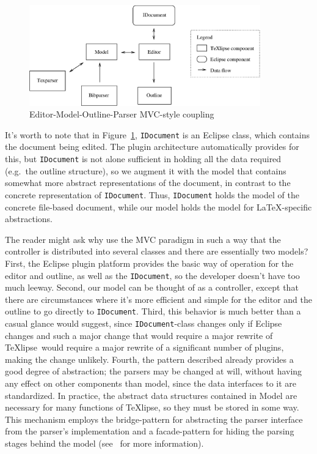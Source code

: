 \documentclass[a4paper,11pt,twoside]{article}
\newcommand{\texlipse}{\TeX lipse}
\begin{document}
\begin{figure}[!htp]
\begin{center}
\includegraphics[width=10cm]{images/emop}
\caption{Editor-Model-Outline-Parser MVC-style coupling}
\label{fig:emop}
\end{center}
\end{figure} 

It's worth to note that in Figure~\ref{fig:emop}, \texttt{IDocument} is an 
Eclipse class, which contains the document being edited. The plugin 
architecture automatically provides for this, but \texttt{IDocument} is not 
alone sufficient in holding all the data required (e.g.\ the outline structure), 
so we augment it with the model that contains somewhat more abstract 
representations of the document, in contrast to the concrete representation of 
\texttt{IDocument}. Thus, \texttt{IDocument} holds the model of the concrete 
file-based document, while our model holds the model for \LaTeX -specific 
abstractions.

The reader might ask why use the MVC paradigm in such a way that the controller 
is distributed into several classes and there are essentially two models? 
First, the Eclipse plugin platform provides the basic way of operation for the 
editor and outline, as well as the \texttt{IDocument}, so the developer doesn't 
have too much leeway. Second, our model can be thought of as a controller, 
except that there are circumstances where it's more efficient and simple for 
the editor and the outline to go directly to \texttt{IDocument}. Third, this 
behavior is much better than a casual glance would suggest, since 
\texttt{IDocument}-class changes only if Eclipse changes and such a major 
change that would require a major rewrite of \texlipse\ would require a major 
rewrite of a significant number of plugins, making the change unlikely. Fourth, 
the pattern described already provides a good degree of abstraction; the 
parsers may be changed at will, without having any effect on other components 
than model, since the data interfaces to it are standardized. In practice, the
abstract data structures contained in Model are necessary for many functions of
\texlipse, so they must be stored in some way. This mechanism employs the
bridge-pattern for abstracting the parser interface from the parser's
implementation and a facade-pattern for hiding the parsing stages behind the
model (see~\cite{GHJV:despatterns95} for more information).
\end{document}
